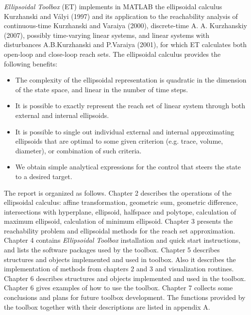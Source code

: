 \documentclass[letterpaper,10pt,english]{sphinxmanual}
\begin{document}
\emph{Ellipsoidal Toolbox} (ET) implements in MATLAB the ellipsoidal calculus
Kurzhanski and Vályi (1997) and its application to the reachability
analysis of continuous-time Kurzhanski and Varaiya (2000), discrete-time
A. A. Kurzhanskiy (2007), possibly time-varying linear systems, and
linear systems with disturbances A.B.Kurzhanski and P.Varaiya (2001),
for which ET calculates both open-loop and close-loop reach sets. The
ellipsoidal calculus provides the following benefits:
\begin{itemize}
\item {} 
The complexity of the ellipsoidal representation is quadratic in the
dimension of the state space, and linear in the number of time steps.

\item {} 
It is possible to exactly represent the reach set of linear system
through both external and internal ellipsoids.

\item {} 
It is possible to single out individual external and internal
approximating ellipsoids that are optimal to some given criterion
(e.g. trace, volume, diameter), or combination of such criteria.

\item {} 
We obtain simple analytical expressions for the control that steers
the state to a desired target.

\end{itemize}

The report is organized as follows. Chapter 2 describes the operations
of the ellipsoidal calculus: affine transformation, geometric sum,
geometric difference, intersections with hyperplane, ellipsoid,
halfspace and polytope, calculation of maximum ellipsoid, calculation of
minimum ellipsoid. Chapter 3 presents the reachability problem and
ellipsoidal methods for the reach set approximation. Chapter 4 contains
\emph{Ellipsoidal Toolbox} installation and quick start instructions, and
lists the software packages used by the toolbox. Chapter 5 describes
structures and objects implemented and used in toolbox. Also it
describes the implementation of methods from chapters 2 and 3 and
visualization routines. Chapter 6 describes structures and objects
implemented and used in the toolbox. Chapter 6 gives examples of how to
use the toolbox. Chapter 7 collects some conclusions and plans for
future toolbox development. The functions provided by the toolbox
together with their descriptions are listed in appendix A.
\end{document}
